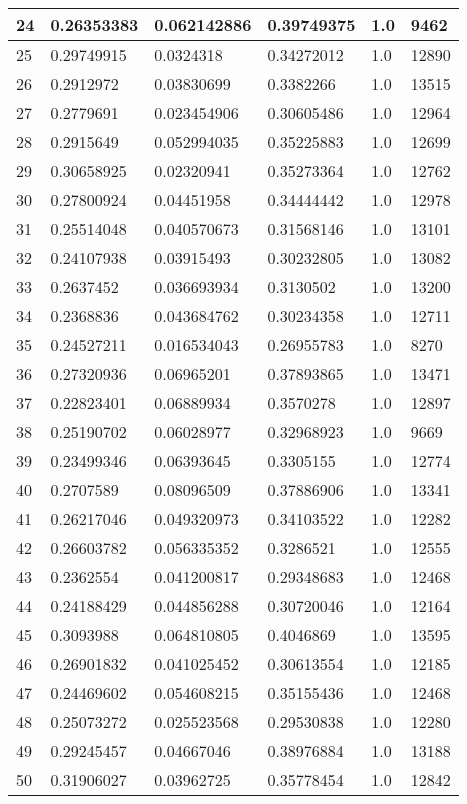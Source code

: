 \begin{longtable}{|l|l|l|l|l|l|}
24 & 0.26353383 & 0.062142886 & 0.39749375 & 1.0 & 9462 \\ \hline 
25 & 0.29749915 & 0.0324318 & 0.34272012 & 1.0 & 12890 \\ \hline 
26 & 0.2912972 & 0.03830699 & 0.3382266 & 1.0 & 13515 \\ \hline 
27 & 0.2779691 & 0.023454906 & 0.30605486 & 1.0 & 12964 \\ \hline 
28 & 0.2915649 & 0.052994035 & 0.35225883 & 1.0 & 12699 \\ \hline 
29 & 0.30658925 & 0.02320941 & 0.35273364 & 1.0 & 12762 \\ \hline 
30 & 0.27800924 & 0.04451958 & 0.34444442 & 1.0 & 12978 \\ \hline 
31 & 0.25514048 & 0.040570673 & 0.31568146 & 1.0 & 13101 \\ \hline 
32 & 0.24107938 & 0.03915493 & 0.30232805 & 1.0 & 13082 \\ \hline 
33 & 0.2637452 & 0.036693934 & 0.3130502 & 1.0 & 13200 \\ \hline 
34 & 0.2368836 & 0.043684762 & 0.30234358 & 1.0 & 12711 \\ \hline 
35 & 0.24527211 & 0.016534043 & 0.26955783 & 1.0 & 8270 \\ \hline 
36 & 0.27320936 & 0.06965201 & 0.37893865 & 1.0 & 13471 \\ \hline 
37 & 0.22823401 & 0.06889934 & 0.3570278 & 1.0 & 12897 \\ \hline 
38 & 0.25190702 & 0.06028977 & 0.32968923 & 1.0 & 9669 \\ \hline 
39 & 0.23499346 & 0.06393645 & 0.3305155 & 1.0 & 12774 \\ \hline 
40 & 0.2707589 & 0.08096509 & 0.37886906 & 1.0 & 13341 \\ \hline 
41 & 0.26217046 & 0.049320973 & 0.34103522 & 1.0 & 12282 \\ \hline 
42 & 0.26603782 & 0.056335352 & 0.3286521 & 1.0 & 12555 \\ \hline 
43 & 0.2362554 & 0.041200817 & 0.29348683 & 1.0 & 12468 \\ \hline 
44 & 0.24188429 & 0.044856288 & 0.30720046 & 1.0 & 12164 \\ \hline 
45 & 0.3093988 & 0.064810805 & 0.4046869 & 1.0 & 13595 \\ \hline 
46 & 0.26901832 & 0.041025452 & 0.30613554 & 1.0 & 12185 \\ \hline 
47 & 0.24469602 & 0.054608215 & 0.35155436 & 1.0 & 12468 \\ \hline 
48 & 0.25073272 & 0.025523568 & 0.29530838 & 1.0 & 12280 \\ \hline 
49 & 0.29245457 & 0.04667046 & 0.38976884 & 1.0 & 13188 \\ \hline 
50 & 0.31906027 & 0.03962725 & 0.35778454 & 1.0 & 12842 \\ \hline 
\end{longtable}